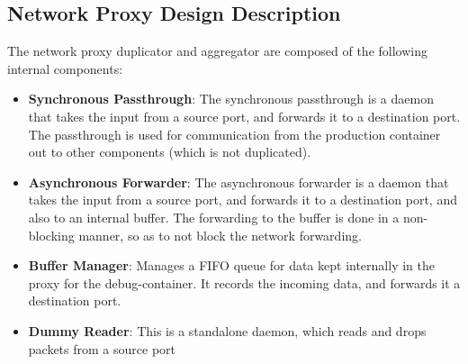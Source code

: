 

\subsection{Network Proxy Design Description}

The network proxy duplicator and aggregator are composed of the following internal components:

\begin{itemize}[leftmargin=*]
	\item \textbf{Synchronous Passthrough}: The synchronous passthrough is a daemon that takes the input from a source port, and forwards it to a destination port. The passthrough is used for communication from the production container out to other components (which is not duplicated).
	\item \textbf{Asynchronous Forwarder}: The asynchronous forwarder is a daemon that takes the input from a source port, and forwards it to a destination port, and also to an internal buffer. The forwarding to the buffer is done in a non-blocking manner, so as to not block the network forwarding. 
	\item \textbf{Buffer Manager}: Manages a FIFO queue for data kept internally in the proxy for the debug-container.
	It records the incoming data, and forwards it a destination port. 
	\item \textbf{Dummy Reader}: This is a standalone daemon, which reads and drops packets from a source port
\end{itemize}

\noindent

